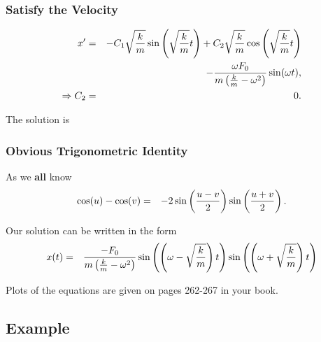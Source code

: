 \begin{frame}
  \frametitle{Satisfy the Velocity}

  \begin{eqnarray*}
    x' & = & - C_1 \sqrt{\frac{k}{m}} \sin\left(\sqrt{\frac{k}{m}}t\right) + C_2 \sqrt{\frac{k}{m}} \cos\left(\sqrt{\frac{k}{m}}t\right) \\ 
    & & - \frac{\omega F_0}{m\left(\frac{k}{m}-\omega^2\right)} \sin(\omega t), \\
    \Rightarrow C_2 & = & 0.
  \end{eqnarray*}

  {
    The solution is 
  }


\end{frame}


\begin{frame}
  \frametitle{Obvious Trigonometric Identity}

  As we \textbf{all} know
  \begin{eqnarray*}
    \cos(u) - \cos(v) & = & -2 \sin\left(\frac{u-v}{2}\right) \sin\left(\frac{u+v}{2}\right).
  \end{eqnarray*}

  Our solution can be written in the form
  \begin{eqnarray*}
    x(t) & = & \frac{-F_0}{m\left(\frac{k}{m}-\omega^2\right)} \sin\left(\left(\omega-\sqrt{\frac{k}{m}}\right) t\right)
                                                        \sin\left(\left(\omega+\sqrt{\frac{k}{m}}\right) t\right)
  \end{eqnarray*}

  Plots of the equations are given on pages 262-267 in your book.

\end{frame}

\subsection{Example}

